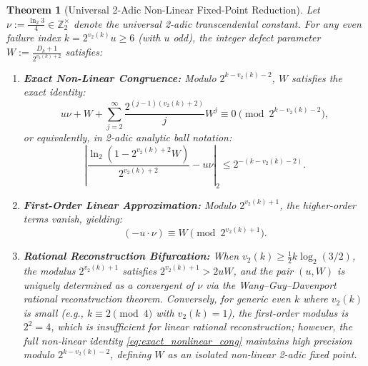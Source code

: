 \documentclass[11pt,reqno]{amsart}
\newtheorem{theorem}{Theorem}[section]
\theoremstyle{definition}
\numberwithin{equation}{section}
\begin{document}
\begin{theorem}[Universal 2-Adic Non-Linear Fixed-Point Reduction]\label{thm:nu_reduction}
Let $\nu := \frac{\ln_2 3}{4} \in \mathbb{Z}_2^\times$ denote the universal 2-adic transcendental constant.
For any even failure index $k = 2^{v_2(k)} u \ge 6$ (with $u$ odd), the integer defect parameter $W := \frac{D_k + 1}{2^{v_2(k)+2}}$ satisfies:
\begin{enumerate}
    \item \textbf{Exact Non-Linear Congruence:} Modulo $2^{k - v_2(k) - 2}$, $W$ satisfies the exact identity:
    \begin{equation}\label{eq:exact_nonlinear_cong}
    u \nu + W + \sum_{j=2}^\infty \frac{2^{(j-1)(v_2(k)+2)}}{j} W^j \equiv 0 \pmod{2^{k - v_2(k) - 2}},
    \end{equation}
    or equivalently, in 2-adic analytic ball notation:
    \begin{equation}\label{eq:analytic_ball}
    \left| \frac{\ln_2(1 - 2^{v_2(k)+2} W)}{2^{v_2(k)+2}} - u \nu \right|_2 \le 2^{-(k - v_2(k) - 2)}.
    \end{equation}
    \item \textbf{First-Order Linear Approximation:} Modulo $2^{v_2(k) + 1}$, the higher-order terms vanish, yielding:
    \begin{equation}\label{eq:first_order_lin}
    (-u \cdot \nu) \equiv W \pmod{2^{v_2(k) + 1}}.
    \end{equation}
    \item \textbf{Rational Reconstruction Bifurcation:}
    When $v_2(k) \ge \frac{1}{2} k \log_2(3/2)$, the modulus $2^{v_2(k)+1}$ satisfies $2^{v_2(k)+1} > 2 u W$, and the pair $(u, W)$ is uniquely determined as a convergent of $\nu$ via the Wang--Guy--Davenport rational reconstruction theorem.
    Conversely, for generic even $k$ where $v_2(k)$ is small (e.g., $k \equiv 2 \pmod 4$ with $v_2(k) = 1$), the first-order modulus is $2^2 = 4$, which is insufficient for linear rational reconstruction; however, the full non-linear identity \eqref{eq:exact_nonlinear_cong} maintains high precision modulo $2^{k - v_2(k) - 2}$, defining $W$ as an isolated non-linear 2-adic fixed point.
\end{enumerate}
\end{theorem}
\end{document}
